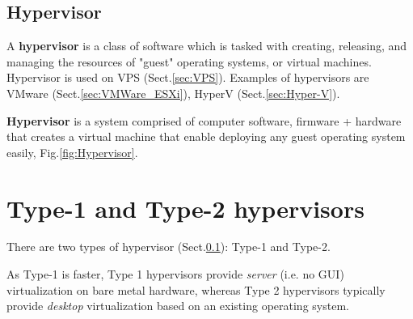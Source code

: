 \subsection{Hypervisor}
\label{sec:hypervisor}


A {\bf hypervisor} is a class of software  which is tasked with creating,
releasing, and managing the resources of "guest" operating systems, or virtual
machines. Hypervisor is used on VPS (Sect.\ref{sec:VPS}). Examples of
hypervisors are VMware (Sect.\ref{sec:VMWare_ESXi}), HyperV
(Sect.\ref{sec:Hyper-V}).

{\bf Hypervisor} is a system comprised of computer software, firmware + hardware
that creates a virtual machine that enable deploying any guest operating system
easily, Fig.\ref{fig:Hypervisor}. 

\section{Type-1 and Type-2 hypervisors}
\label{sec:hypervisor-type-I}
\label{sec:hypervisor-type-II}


There are two types of hypervisor (Sect.\ref{sec:hypervisor}): Type-1 and Type-2.


As Type-1 is faster, Type 1 hypervisors provide {\it server} (i.e. no GUI)
virtualization on bare metal hardware, whereas Type 2 hypervisors typically
provide {\it desktop} virtualization based on an existing operating system.



